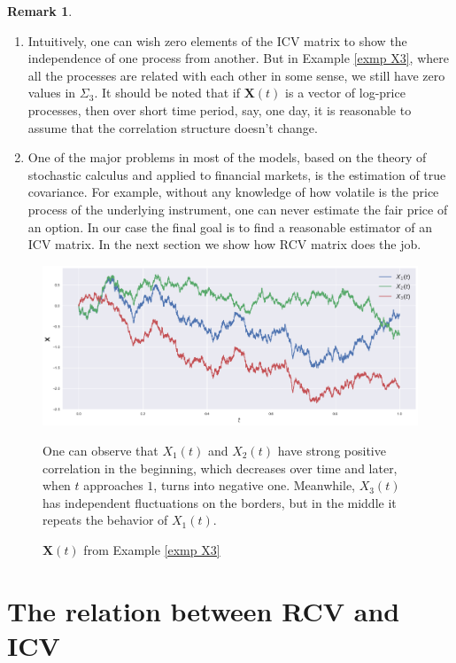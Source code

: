 \documentclass[a4paper,11pt]{book}
\theoremstyle{plain}
\theoremstyle{definition}
\newtheorem{rmrk}[thm]{Remark}
\begin{document}
	\begin{rmrk} \
		\begin{enumerate}
			\item 
			Intuitively, one can wish zero elements of the ICV matrix to show the independence of one process from another. But in Example \ref{exmp X3}, where all the processes are related with each other in some sense, we still have zero values in $\Sigma_3$. It should be noted that if $\mathbf{X}(t)$ is a vector of log-price processes, then over short time period, say, one day, it is reasonable to assume that the correlation structure doesn't change.
			\item One of the major problems in most of the models, based on the theory of stochastic calculus and applied to financial markets, is the estimation of true covariance. For example, without any knowledge of how volatile is the price process of the underlying instrument, one can never estimate the fair price of an option. In our case the final goal is to find a reasonable estimator of an ICV matrix. In the next section we show how RCV matrix does the job.
		\end{enumerate}
	\end{rmrk}
	
	\begin{figure}
		\begin{center} \centering
			\includegraphics[scale=0.4]{X3}
			\caption{$\mathbf{X}(t)$ from Example \ref{exmp X3}}
			\smallskip
			\small
			One can observe that $X_1(t)$ and $X_2(t)$ have strong positive correlation in the beginning, which decreases over time and later, when $t$ approaches $1$, turns into negative one. Meanwhile, $X_3(t)$ has independent fluctuations on the borders, but in the middle it repeats the behavior of $X_1(t)$.
		\end{center}
	\end{figure}
	
	\section{The relation between RCV and ICV}
	
\end{document}

